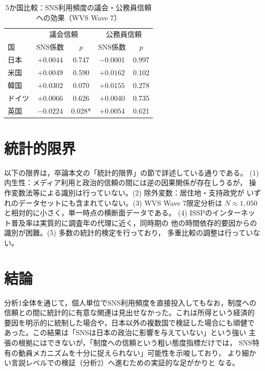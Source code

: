 \documentclass[dvipdfmx, a4paper, 11pt]{jsarticle}
\begin{document}
\begin{table}[H]
\centering
\caption{5か国比較：SNS利用頻度の議会・公務員信頼への効果（WVS Wave 7）}
\label{tab:cross-country}
\begin{tabular}{lcccc}
\toprule
 & \multicolumn{2}{c}{議会信頼} & \multicolumn{2}{c}{公務員信頼} \\
国 & SNS係数 & $p$ & SNS係数 & $p$ \\
\midrule
日本    & $+0.0044$ & 0.747 & $-0.0001$ & 0.997 \\
米国    & $+0.0049$ & 0.590 & $+0.0162$ & 0.102 \\
韓国    & $+0.0302$ & 0.070 & $+0.0155$ & 0.278 \\
ドイツ  & $+0.0066$ & 0.626 & $+0.0040$ & 0.735 \\
英国    & $-0.0224$ & 0.028* & $+0.0054$ & 0.621 \\
\bottomrule
\end{tabular}
\end{table}

\section{統計的限界}
以下の限界は，卒論本文の「統計的限界」の節で詳述している通りである。
(1) 内生性：メディア利用と政治的信頼の間には逆の因果関係が存在しうるが，
操作変数法等による識別は行っていない。(2) 除外変数：居住地・支持政党が
いずれのデータセットにも含まれていない。(3) WVS Wave 7限定分析は
$N\approx1{,}050$と相対的に小さく，単一時点の横断面データである。
(4) ISSPのインターネット普及率は実質的に調査年の代理に近く，同時期の
他の時間依存的要因からの識別が困難。(5) 多数の統計的検定を行っており，
多重比較の調整は行っていない。

\section{結論}
分析1全体を通じて，個人単位でSNS利用頻度を直接投入してもなお，制度への
信頼との間に統計的に有意な関連は見出せなかった。これは所得という経済的
要因を明示的に統制した場合や，日本以外の複数国で検証した場合にも頑健で
あった。この結果は「SNSは日本の政治に影響を与えていない」という強い
主張の根拠にはできないが，「制度への信頼という粗い態度指標だけでは，
SNS特有の動員メカニズムを十分に捉えられない」可能性を示唆しており，
より細かい言説レベルでの検証（分析2）へ進むための実証的な足がかりと
なる。
\end{document}
